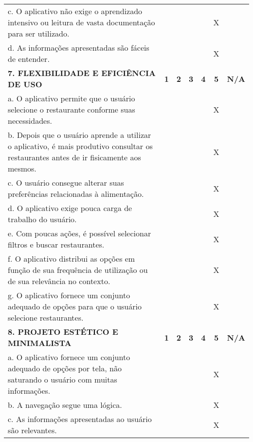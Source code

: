 \documentclass[portuguese,oneside]{tcc}
\begin{document}
\begin{center}
\begin{longtabu}{|L{25em}|c|c|c|c|c|c|}
																																	c. O aplicativo não exige o aprendizado intensivo ou leitura de vasta documentação para ser utilizado. & & & & & X & \\ 
																																	d. As informações apresentadas são fáceis de entender. & & & & & X & \\ 
																																	\textbf{7. FLEXIBILIDADE E EFICIÊNCIA DE USO} & \textbf{1} & \textbf{2} & \textbf{3} & \textbf{4} & \textbf{5} & \textbf{N/A} \\ 
																																	a. O aplicativo permite que o usuário selecione o restaurante conforme suas necessidades. & & & & & X & \\ 
																																	b. Depois que o usuário aprende a utilizar o aplicativo, é mais produtivo consultar os restaurantes antes de ir fisicamente aos mesmos. & & & & & X & \\ 
																																	c. O usuário consegue alterar suas preferências relacionadas à alimentação. & & & & & X & \\ 
																																	d. O aplicativo exige pouca carga de trabalho do usuário. & & & & & X & \\ 
																																	e. Com poucas ações, é possível selecionar filtros e buscar restaurantes. & & & & & X & \\ 
																																	f. O aplicativo distribui as opções em função de sua frequência de utilização ou de sua relevância no contexto.	& & & & & X & \\ 
																																	g. O aplicativo fornece um conjunto adequado de opções para que o usuário selecione restaurantes. & & & & & X & \\ 
																																	\textbf{8. PROJETO ESTÉTICO E MINIMALISTA} & \textbf{1} & \textbf{2} & \textbf{3} & \textbf{4} & \textbf{5} & \textbf{N/A} \\ 
																																	a. O aplicativo fornece um conjunto adequado de opções por tela, não saturando o usuário com muitas informações. & & & & & X & \\ 
																																	b. A navegação segue uma lógica. & & & & & X & \\ 
																																	c. As informações apresentadas ao usuário são relevantes. & & & & & X & \\ 

\end{longtabu}
\end{center}
\end{document}
